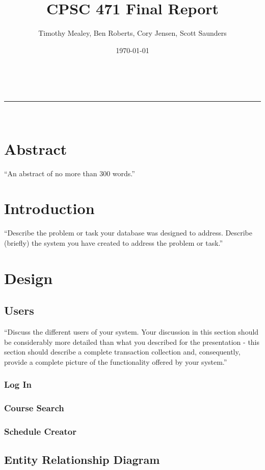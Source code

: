 \documentclass[twoside=false,a4paper,11pt]{article}
\makeatletter
\newcommand{\linia}{\rule{\linewidth}{0.5pt}}
\theoremstyle{mytheor}
\renewcommand{\maketitle}{
\begin{center}
\vspace{2ex}
{\huge \textsc{\@title}}
\vspace{1ex}
\\
\linia\\
\@author \hfill \@date
\vspace{4ex}
\end{center}
}
\makeatother
\begin{document}
\title{CPSC 471 Final Report}
\author{Timothy Mealey, Ben Roberts, Cory Jensen, Scott Saunders}
\date{\today}
\maketitle

\section*{Abstract}

``An abstract of no more than 300 words.''

\section*{Introduction}

``Describe the problem or task your database was designed to address.
Describe (briefly) the system you have created to address the problem or task.''

\section*{Design}

\subsection*{Users}

``Discuss the different users of your system. Your discussion in this section should be considerably more detailed than what you described for the presentation - this section should describe a complete transaction collection and, consequently, provide a complete picture of the functionality offered by your system.''


\subsubsection*{Log In}
\subsubsection*{Course Search}
\subsubsection*{Schedule Creator}

\subsection*{Entity Relationship Diagram}
\end{document}
